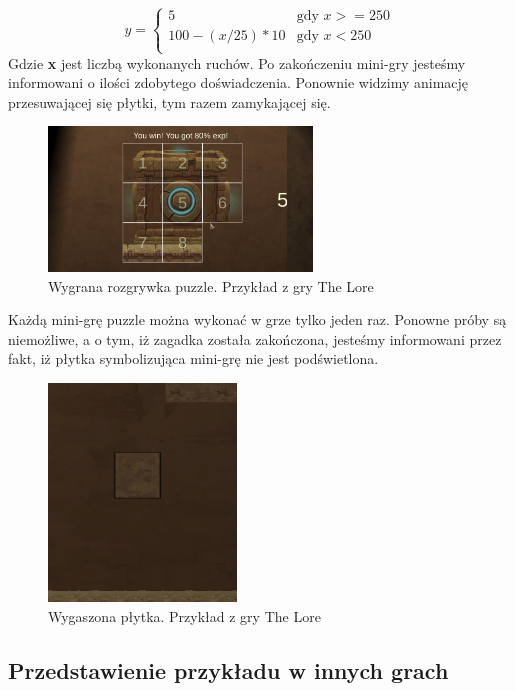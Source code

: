 \documentclass[oneside,polski,logo]{amuthesis}
\begin{document}
$$
y = \left\{ \begin{array}{ll}
5 & \textrm{gdy $x>=250$}\\
100 - (x / 25) * 10 & \textrm{gdy $x<250$}\\
\end{array} \right.
$$
Gdzie \textbf{x} jest liczbą wykonanych ruchów.
Po zakończeniu mini-gry jesteśmy informowani o ilości zdobytego doświadczenia. Ponownie widzimy animację przesuwającej się płytki, tym razem zamykającej się.
\begin{figure}[h]
	\centering
	\includegraphics[width=7cm]{images/tyrek/puzzle_end.png}
	\caption{Wygrana rozgrywka puzzle. Przykład z gry The Lore}
\end{figure}

Każdą mini-grę puzzle można wykonać w grze tylko jeden raz. Ponowne próby są niemożliwe, a o tym, iż zagadka została zakończona, jesteśmy informowani przez fakt, iż płytka symbolizująca mini-grę nie jest podświetlona.

\begin{figure}[h]
	\centering
	\includegraphics[width=5cm]{images/tyrek/puzzleWin.png}
	\caption{Wygaszona płytka. Przykład z gry The Lore}
\end{figure}


\subsection{Przedstawienie przykładu w innych grach}
\end{document}
